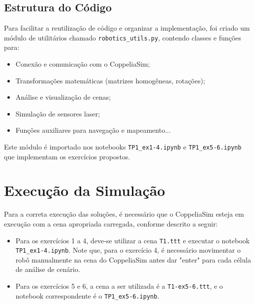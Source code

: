 \documentclass[
	12pt,				%
	oneside, %
	a4paper,			%
	english,			%
	french,				%
	spanish,			%
	brazil				%
	]{abntex2}
\begin{document}
\subsection{Estrutura do Código} \label{subsec:estrutura-codigo}

Para facilitar a reutilização de código e organizar a implementação, foi criado um módulo de utilitários chamado \texttt{robotics\_utils.py}, contendo classes e funções para:

\begin{itemize}
    \item Conexão e comunicação com o CoppeliaSim;
    \item Transformações matemáticas (matrizes homogêneas, rotações);
    \item Análise e visualização de cenas;
    \item Simulação de sensores laser;
    \item Funções auxiliares para navegação e mapeamento...
\end{itemize}

Este módulo é importado nos notebooks \texttt{TP1\_ex1-4.ipynb} e \texttt{TP1\_ex5-6.ipynb} que implementam os exercícios propostos.

\section{Execução da Simulação} \label{subsec:run}

Para a correta execução das soluções, é necessário que o CoppeliaSim esteja em execução com a cena apropriada carregada, conforme descrito a seguir:
\begin{itemize}
    \item Para os exercícios 1 a 4, deve-se utilizar a cena \texttt{T1.ttt} e executar o notebook \texttt{TP1\_ex1-4.ipynb}. Note que, para o exercício 4, é necessário movimentar o robô manualmente na cena do CoppeliaSim antes dar "enter" para cada célula de análise de cenário.
    \item Para os exercícios 5 e 6, a cena a ser utilizada é a \texttt{T1-ex5-6.ttt}, e o notebook correspondente é o \texttt{TP1\_ex5-6.ipynb}.
\end{itemize}



%
\end{document}
